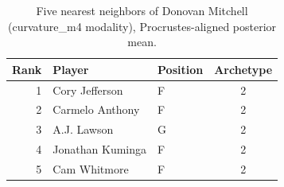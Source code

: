 \begin{table}[htbp]
  \centering\small
  \begin{tabular}{rllc}
    \toprule
    Rank & Player & Position & Archetype \\
    \midrule
    1 & Cory Jefferson & F & 2 \\
    2 & Carmelo Anthony & F & 2 \\
    3 & A.J. Lawson & G & 2 \\
    4 & Jonathan Kuminga & F & 2 \\
    5 & Cam Whitmore & F & 2 \\
    \bottomrule
  \end{tabular}
  \caption{Five nearest neighbors of Donovan Mitchell (curvature_m4 modality), Procrustes-aligned posterior mean.}
  \label{tab:Donovan_Mitchell_neighbors_curvature_m4}
\end{table}

